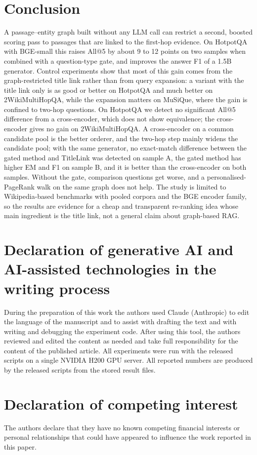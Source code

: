 \documentclass[a4paper,fleqn]{cas-sc}
\begin{document}
\section{Conclusion}\label{sec:conclusion}
A passage--entity graph built without any LLM call can restrict a second, boosted scoring pass to passages that are linked to the first-hop evidence. On HotpotQA with BGE-small this raises All@5 by about 9 to 12 points on two samples when combined with a question-type gate, and improves the answer F1 of a 1.5B generator. Control experiments show that most of this gain comes from the graph-restricted title link rather than from query expansion: a variant with the title link only is as good or better on HotpotQA and much better on 2WikiMultiHopQA, while the expansion matters on MuSiQue, where the gain is confined to two-hop questions. On HotpotQA we detect no significant All@5 difference from a cross-encoder, which does not show equivalence; the cross-encoder gives no gain on 2WikiMultiHopQA. A cross-encoder on a common candidate pool is the better orderer, and the two-hop step mainly widens the candidate pool; with the same generator, no exact-match difference between the gated method and TitleLink was detected on sample A, the gated method has higher EM and F1 on sample B, and it is better than the cross-encoder on both samples. Without the gate, comparison questions get worse, and a personalised-PageRank walk on the same graph does not help. The study is limited to Wikipedia-based benchmarks with pooled corpora and the BGE encoder family, so the results are evidence for a cheap and transparent re-ranking idea whose main ingredient is the title link, not a general claim about graph-based RAG.

\section*{Declaration of generative AI and AI-assisted technologies in the writing process}
During the preparation of this work the authors used Claude (Anthropic) to edit the language of the manuscript and to assist with drafting the text and with writing and debugging the experiment code. After using this tool, the authors reviewed and edited the content as needed and take full responsibility for the content of the published article. All experiments were run with the released scripts on a single NVIDIA H200 GPU server. All reported numbers are produced by the released scripts from the stored result files.

\section*{Declaration of competing interest}
The authors declare that they have no known competing financial interests or personal relationships that could have appeared to influence the work reported in this paper.
\end{document}
